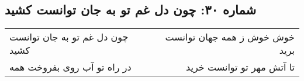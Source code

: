 \begin{center}
\section*{شماره ۳۰: چون دل غم تو به جان توانست کشید}
\label{sec:030}
\begin{longtable}{l p{0.5cm} r}
چون دل غم تو به جان توانست کشید
&&
خوش خوش ز همه جهان توانست برید
\\
در راه تو آب روی بفروخت همه
&&
تا آتش مهر تو توانست خرید
\\
\end{longtable}
\end{center}
